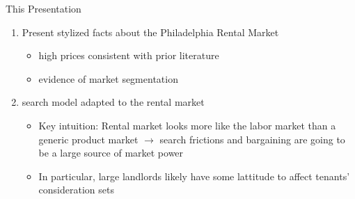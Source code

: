 \documentclass[10pt, xcolor=dvipsnames]{beamer}
\begin{document}
\begin{frame}{This Presentation}
    \begin{enumerate}
        \item Present stylized facts about the Philadelphia Rental Market
        \begin{itemize}
            \item high prices consistent with prior literature
            \item evidence of market segmentation
        \end{itemize}
         \pause
        \item \cite{jarosh-search-2024} search model adapted to the rental market
        \pause
        \begin{itemize}
            \item Key intuition: Rental market looks more like the labor market than a generic product market $\rightarrow$ search frictions and bargaining are going to be a large source of market power
            \item In particular, large landlords likely have some lattitude to affect tenants' consideration sets
        \end{itemize}
    \end{enumerate}
    
\end{frame}


    
\end{document}
